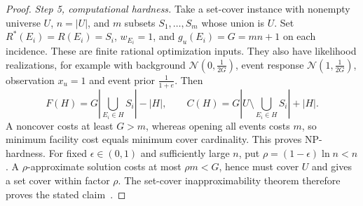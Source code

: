 \documentclass[10pt]{article}
\theoremstyle{plain}
\theoremstyle{remark}
\begin{document}
\begin{proof}
\emph{Step 5, computational hardness.} Take a set-cover instance with nonempty universe $U$, $n=|U|$, and $m$ subsets $S_1,\ldots,S_m$ whose union is $U$. Set $R^*(E_i)=R(E_i)=S_i$, $w_{E_i}=1$, and $g_u(E_i)=G=mn+1$ on each incidence. These are finite rational optimization inputs. They also have likelihood realizations, for example with background $\mathcal N(0,\tfrac{1}{2G})$, event response $\mathcal N(1,\tfrac{1}{2G})$, observation $x_u=1$ and event prior $\tfrac{1}{1+e}$. Then
\[
F(H)=G\left|\bigcup_{E_i\in H}S_i\right|-|H|,
\qquad
C(H)=G\left|U\setminus\bigcup_{E_i\in H}S_i\right|+|H|.
\]
A noncover costs at least $G>m$, whereas opening all events costs $m$, so minimum facility cost equals minimum cover cardinality. This proves NP-hardness. For fixed $\epsilon\in(0,1)$ and sufficiently large $n$, put $\rho=(1-\epsilon)\ln n<n$. A $\rho$-approximate solution costs at most $\rho m<G$, hence must cover $U$ and gives a set cover within factor $\rho$. The set-cover inapproximability theorem therefore proves the stated claim~\cite{DinurSteurer14}.

\end{proof}
\end{document}

